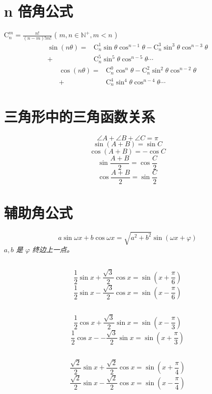 \documentclass[a4paper, fleqn, fontset = mac]{ctexart}
\newcommand{\diform}{\noindent}
\renewcommand{\binom}[2]{\mathrm{C}_{#1}^{#2}}
\begin{document}
\begin{multicols}{2}
	\section{n 倍角公式}
	$ \binom{n}{m} =\frac{n!}{\left( n - m\right)! m!} $
	( $ m, n \in \mathbb{N^+}, m < n $ )
	\begin{align*}
		\sin\left(n\theta\right)
		= & \binom n1\sin\theta\cos^{n-1}\theta
		- \binom n3\sin^{3}\theta\cos^{n-3}\theta \\
		+ & \binom n5\sin^{5}\theta\cos^{n-5}\theta \cdots 
	\end{align*}
	\begin{align*}
		\cos\left(n\theta\right) 
		= & \binom n0\cos^{n}\theta
		- \binom n2\sin^{2}\theta\cos^{n-2}\theta \\
		+ & \binom n4\sin^{4}\theta\cos^{n-4}\theta \cdots
	\end{align*}
	
	\section{三角形中的三角函数关系}
	\diform
	\[\angle A + \angle B + \angle C = \pi \]
	\[ \sin\left (A + B \right ) = \sin C \]
	\[ \cos\left (A + B \right ) = -\cos C \]
	\[ \sin\frac{A + B}{2} = \cos \frac C2 \]
	\[ \cos\frac{A + B}{2} = \sin \frac C2 \]
	
	\section{辅助角公式}
	\diform
	\[ a\sin\omega x + b \cos \omega x
	= \sqrt{a^2 + b^2} \sin \left ( \omega x + \varphi \right ) \]
	\emph{$ a, b $ 是 $\varphi$ 终边上一点。}
	
	\subsection{}
	\diform
	\[ \frac12 \sin x + \frac{\sqrt3} 2 \cos x 
	= \sin \left (x + \frac\pi6\right ) \]
	\[ \frac12 \sin x - \frac{\sqrt3} 2 \cos x 
	= \sin \left (x - \frac\pi6\right ) \]
	\subsection{}
	\diform
	\[ \frac12 \cos x + \frac{\sqrt3} 2 \sin x 
	= \sin \left (x - \frac\pi3\right ) \]
	\[ \frac12 \cos x --\frac{\sqrt3} 2 \sin x 
	= \sin \left (x + \frac\pi3\right ) \]
	\subsection{}
	\diform	
	\[ \frac{\sqrt2} 2 \sin x + \frac{\sqrt2} 2 \cos x 
	= \sin \left (x + \frac\pi4\right ) \]
	\[ \frac{\sqrt2} 2 \sin x - \frac{\sqrt2} 2 \cos x 
	= \sin \left (x - \frac\pi4\right ) \]

\end{multicols}
\end{document}
